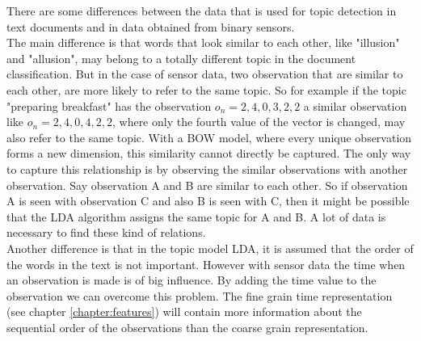 There are some differences between the data that is used for topic detection in text documents and in data obtained from binary sensors.\\
The main difference is that words that look similar to each other, like "illusion" and "allusion", may belong to a totally different topic in the document classification. But in the case of sensor data, two observation that are similar to each other, are more likely to refer to the same topic. So for example if the topic "preparing breakfast" has the observation $o_n = {2,4,0,3,2,2}$ a similar observation like $o_n={2,4,0,4,2,2}$, where only the fourth value of the vector is changed, may also refer to the same topic. With a BOW model, where every unique observation forms a new dimension, this similarity cannot directly be captured. The only way to capture this relationship is by observing the similar observations with another observation. Say observation A and B are similar to each other. So if observation A is seen with observation C and also B is seen with C, then it might be possible that the LDA algorithm assigns the same topic for A and B. A lot of data is necessary to find these kind of relations.\\
Another difference is that in the topic model LDA, it is assumed that the order of the words in the text is not important. However with sensor data the time when an observation is made is of big influence. By adding the time value to the observation we can overcome this problem. The fine grain time representation (see chapter \ref{chapter:features}) will contain more information about the sequential order of the observations than the coarse grain representation.\\





